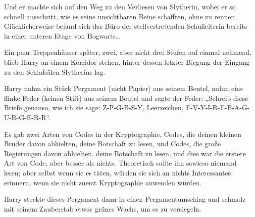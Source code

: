 Und er machte sich auf den Weg zu den Verliesen von Slytherin, wobei er so schnell ausschritt, wie es seine unsichtbaren Beine schafften, ohne zu rennen. Glücklicherweise befand sich das Büro der stellvertretenden Schulleiterin bereits in einer unteren Etage von Hogwarts…

Ein paar Treppenhäuser später, zwei, aber nicht drei Stufen auf einmal nehmend, blieb Harry an einem Korridor stehen, hinter dessen letzter Biegung der Eingang zu den Schlafsälen Slytherins lag.

Harry nahm ein Stück Pergament (nicht Papier) aus seinem Beutel, nahm eine flinke Feder (keinen Stift) aus seinem Beutel und sagte der Feder: „Schreib diese Briefe genauso, wie ich sie sage: Z-P-G-B-S-Y, Leerzeichen, F-V-Y-I-R-E-B-A-G-U-R-G-E-R-R“.

Es gab zwei Arten von Codes in der Kryptographie, Codes, die deinen kleinen Bruder davon abhielten, deine Botschaft zu lesen, und Codes, die große Regierungen davon abhielten, deine Botschaft zu lesen, und dies war die erstere Art von Code, aber besser als nichts. Theoretisch sollte ihn sowieso niemand lesen; aber selbst wenn sie es täten, würden sie sich an nichts Interessantes erinnern, wenn sie nicht zuerst Kryptographie anwenden würden.

Harry steckte dieses Pergament dann in einen Pergamentumschlag und schmolz mit seinem Zauberstab etwas grünes Wachs, um es zu versiegeln.

